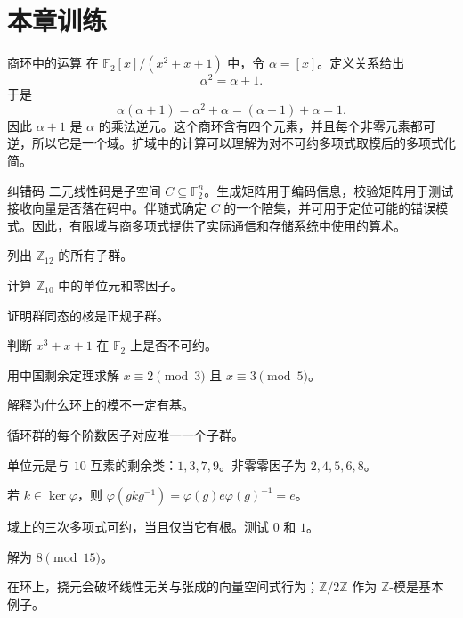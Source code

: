 \section{本章训练}

\begin{workedexample}{商环中的运算}
在 $\mathbb{F}_2[x]/(x^2+x+1)$ 中，令 $\alpha=[x]$。定义关系给出
\[
    \alpha^2=\alpha+1.
\]
于是
\[
    \alpha(\alpha+1)=\alpha^2+\alpha=(\alpha+1)+\alpha=1.
\]
因此 $\alpha+1$ 是 $\alpha$ 的乘法逆元。这个商环含有四个元素，并且每个非零元素都可逆，所以它是一个域。扩域中的计算可以理解为对不可约多项式取模后的多项式化简。
\end{workedexample}

\begin{applicationbox}{纠错码}
二元线性码是子空间 $C\subseteq\mathbb{F}_2^n$。生成矩阵用于编码信息，校验矩阵用于测试接收向量是否落在码中。伴随式确定 $C$ 的一个陪集，并可用于定位可能的错误模式。因此，有限域与商多项式提供了实际通信和存储系统中使用的算术。
\end{applicationbox}

\begin{chapterexercises}
    \item 列出 $\mathbb{Z}_{12}$ 的所有子群。
    \item 计算 $\mathbb{Z}_{10}$ 中的单位元和零因子。
    \item 证明群同态的核是正规子群。
    \item 判断 $x^3+x+1$ 在 $\mathbb{F}_2$ 上是否不可约。
    \item 用中国剩余定理求解 $x\equiv2\pmod3$ 且 $x\equiv3\pmod5$。
    \item 解释为什么环上的模不一定有基。
\end{chapterexercises}

\begin{selectedhints}
    \item 循环群的每个阶数因子对应唯一一个子群。
    \item 单位元是与 $10$ 互素的剩余类：$1,3,7,9$。非零零因子为 $2,4,5,6,8$。
    \item 若 $k\in\ker\varphi$，则 $\varphi(gkg^{-1})=\varphi(g)e\varphi(g)^{-1}=e$。
    \item 域上的三次多项式可约，当且仅当它有根。测试 $0$ 和 $1$。
    \item 解为 $8\pmod{15}$。
    \item 在环上，挠元会破坏线性无关与张成的向量空间式行为；$\mathbb{Z}/2\mathbb{Z}$ 作为 $\mathbb{Z}$-模是基本例子。
\end{selectedhints}
